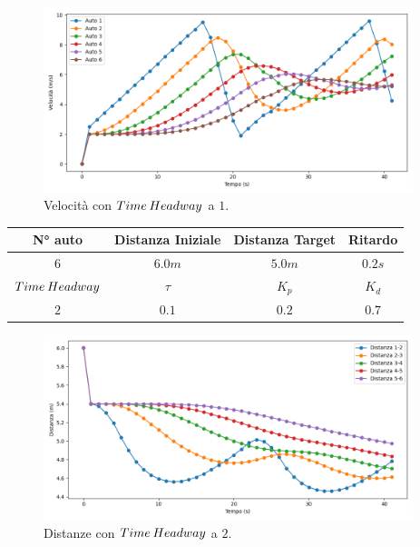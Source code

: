 \begin{figure}[H]
    \includegraphics[width=0.96\textwidth]{images/5-experiment/time-headway/velocity_1.png}
    \caption{Velocità con $Time\hspace{0.2em}Headway$ a $1$.}
    \label{fig:1-headway-velocity}
\end{figure}
\vspace*{\fill}
\newpage
\vspace*{\fill}
\begin{table}[h]
    \centering
    \begin{tabular}{|c|c|c|c|}
        \hline
        N° auto & Distanza Iniziale & Distanza Target & Ritardo \\
        \hline
        $6$ & $6.0 m$ & $5.0 m$ & $0.2 s$ \\
        \hline
        $Time\hspace{0.2em}Headway$ & $\tau$ & $K_p$ & $K_d$  \\
        \hline
        $2$ & $0.1$ & $0.2$ & $0.7$ \\
        \hline
    \end{tabular}
\end{table}

\begin{figure}[H]
    \includegraphics[width=0.96\textwidth]{images/5-experiment/time-headway/distance_2.png}
    \caption{Distanze con $Time\hspace{0.2em}Headway$ a $2$.}
    \label{fig:2-headway-distance}
\end{figure}

